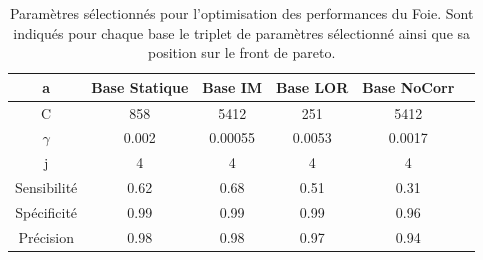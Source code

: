 \begin{table}[h!]
\label{fig:paramsModFoie}
		\begin{tabular}{c| c c c c c}
  \hline
  a	& Base Statique	& Base IM	& Base LOR	& Base NoCorr	\\
  \hline
 C 	& 858		& 5412		& 251		& 5412		\\
\hline
$\gamma$& 0.002		& 0.00055	& 0.0053	& 0.0017	\\
\hline
j	& 4		& 4		& 4		& 4		\\
\hline
\hline
Sensibilité& 0.62	& 0.68		& 0.51		& 0.31	\\
\hline
Spécificité& 0.99	& 0.99		& 0.99		& 0.96		\\
\hline
Précision& 0.98		& 0.98		& 0.97		& 0.94		\\
\hline
 		\end{tabular}

\caption{Paramètres sélectionnés pour l'optimisation des performances du Foie. Sont indiqués pour chaque base le triplet de paramètres sélectionné ainsi que sa position sur le front de pareto.}
\end{table}
